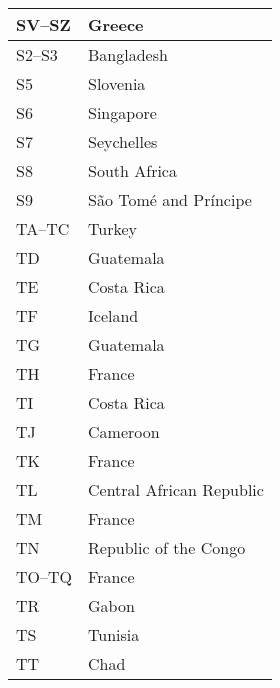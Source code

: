 \begin{longtable}{|l|l|}
  SV--SZ              & Greece                                    \\
  \hline
  S2--S3              & Bangladesh                                \\
  \hline
  S5                  & Slovenia                                  \\
  \hline
  S6                  & Singapore                                 \\
  \hline
  S7                  & Seychelles                                \\
  \hline
  S8                  & South Africa                              \\
  \hline
  S9                  & São Tomé and Príncipe                     \\
  \hline
  TA--TC              & Turkey                                    \\
  \hline
  TD                  & Guatemala                                 \\
  \hline
  TE                  & Costa Rica                                \\
  \hline
  TF                  & Iceland                                   \\
  \hline
  TG                  & Guatemala                                 \\
  \hline
  TH                  & France                                    \\
  \hline
  TI                  & Costa Rica                                \\
  \hline
  TJ                  & Cameroon                                  \\
  \hline
  TK                  & France                                    \\
  \hline
  TL                  & Central African Republic                  \\
  \hline
  TM                  & France                                    \\
  \hline
  TN                  & Republic of the Congo                     \\
  \hline
  TO--TQ              & France                                    \\
  \hline
  TR                  & Gabon                                     \\
  \hline
  TS                  & Tunisia                                   \\
  \hline
  TT                  & Chad                                      \\

\end{longtable}
